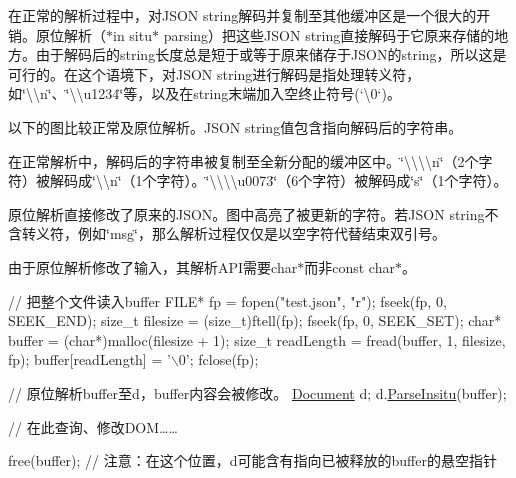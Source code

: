 在正常的解析过程中，对\+J\+S\+ON string解码并复制至其他缓冲区是一个很大的开销。原位解析（$\ast$in situ$\ast$ parsing）把这些\+J\+S\+ON string直接解码于它原来存储的地方。由于解码后的string长度总是短于或等于原来储存于\+J\+S\+O\+N的string，所以这是可行的。在这个语境下，对\+J\+S\+ON string进行解码是指处理转义符，如{\ttfamily \char`\"{}\textbackslash{}\textbackslash{}n\char`\"{}}、{\ttfamily \char`\"{}\textbackslash{}\textbackslash{}u1234\char`\"{}}等，以及在string末端加入空终止符号(`\textquotesingle{}\textbackslash{}0\textquotesingle{}`)。

以下的图比较正常及原位解析。\+J\+S\+ON string值包含指向解码后的字符串。



在正常解析中，解码后的字符串被复制至全新分配的缓冲区中。{\ttfamily \char`\"{}\textbackslash{}\textbackslash{}\textbackslash{}\textbackslash{}n\char`\"{}}（2个字符）被解码成{\ttfamily \char`\"{}\textbackslash{}\textbackslash{}n\char`\"{}}（1个字符）。{\ttfamily \char`\"{}\textbackslash{}\textbackslash{}\textbackslash{}\textbackslash{}u0073\char`\"{}}（6个字符）被解码成{\ttfamily \char`\"{}s\char`\"{}}（1个字符）。



原位解析直接修改了原来的\+J\+S\+O\+N。图中高亮了被更新的字符。若\+J\+S\+ON string不含转义符，例如{\ttfamily \char`\"{}msg\char`\"{}}，那么解析过程仅仅是以空字符代替结束双引号。

由于原位解析修改了输入，其解析\+A\+P\+I需要{\ttfamily char$\ast$}而非{\ttfamily const char$\ast$}。


\begin{DoxyCode}
\textcolor{comment}{// 把整个文件读入buffer}
FILE* fp = fopen(\textcolor{stringliteral}{"test.json"}, \textcolor{stringliteral}{"r"});
fseek(fp, 0, SEEK\_END);
\textcolor{keywordtype}{size\_t} filesize = (size\_t)ftell(fp);
fseek(fp, 0, SEEK\_SET);
\textcolor{keywordtype}{char}* buffer = (\textcolor{keywordtype}{char}*)malloc(filesize + 1);
\textcolor{keywordtype}{size\_t} readLength = fread(buffer, 1, filesize, fp);
buffer[readLength] = \textcolor{charliteral}{'\(\backslash\)0'};
fclose(fp);

\textcolor{comment}{// 原位解析buffer至d，buffer内容会被修改。}
\hyperlink{class_generic_document}{Document} d;
d.\hyperlink{class_generic_document_a301f8f297a5a0da4b6be5459ad766f75}{ParseInsitu}(buffer);

\textcolor{comment}{// 在此查询、修改DOM……}

free(buffer);
\textcolor{comment}{// 注意：在这个位置，d可能含有指向已被释放的buffer的悬空指针}
\end{DoxyCode}


